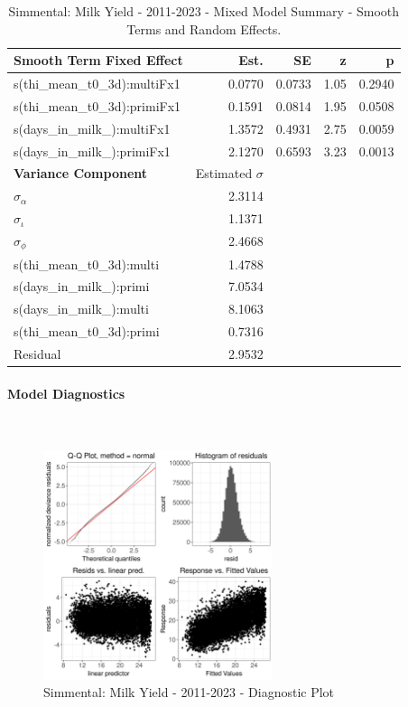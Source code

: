 \newpage
\begin{table}[H]
\centering
\begin{tabular}
{l | r | r | r | r}
\textbf{Smooth Term Fixed Effect} & Est. & SE & z & p\\
\hline
\hline
s(thi\_mean\_t0\_3d):multiFx1 & 0.0770 & 0.0733 & 1.05 & 0.2940\\
s(thi\_mean\_t0\_3d):primiFx1 & 0.1591 & 0.0814 & 1.95 & 0.0508\\
s(days\_in\_milk\_):multiFx1 & 1.3572 & 0.4931 & 2.75 & 0.0059\\
s(days\_in\_milk\_):primiFx1 & 2.1270 & 0.6593 & 3.23 & 0.0013\\
\hline
\textbf{Variance Component} & Estimated $\sigma$ & & & \\
\hline
\hline
$\sigma_\alpha$ & 2.3114 & & & \\
$\sigma_\iota$ & 1.1371 & & & \\
$\sigma_\phi$ & 2.4668 & & & \\
s(thi\_mean\_t0\_3d):multi &  1.4788 & & & \\
s(days\_in\_milk\_):primi & 7.0534 & & & \\
s(days\_in\_milk\_):multi & 8.1063 & & & \\
s(thi\_mean\_t0\_3d):primi & 0.7316 & & & \\
Residual & 2.9532 & & & \\
\end{tabular}
\caption[]{Simmental: Milk Yield - 2011-2023 - Mixed Model Summary - Smooth Terms and Random Effects.}
\end{table}


\paragraph{Model Diagnostics} \quad \\
\begin{figure}[H]
    \centering
    \includegraphics[width=0.6\textwidth]{thesis/figures/models/milk/after2010/si_milk_after2010/si_milk_after2010_diagnostics.png}
    \caption[]{Simmental: Milk Yield - 2011-2023 - Diagnostic Plot}
\end{figure}

